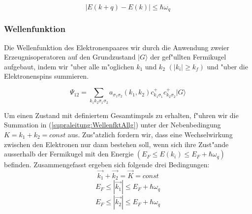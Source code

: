 \begin{refsection}
\begin{equation}
|E(k+q)-E(k)|\le\hbar\omega_q
\label{supraleitung:Phonon Energie}
\end{equation}

\subsubsection{Wellenfunktion}
Die Wellenfunktion des Elektronenpaares wir durch die Anwendung zweier Erzeugnisoperatoren auf den Grundzustand $|G\rangle$ der gef"ullten Fermikugel aufgebaut, indem wir "uber alle m"oglichen $k_1$ und $k_2$ $(|k_i| \ge k_f)$ und "uber die Elektronenspins summieren.

\begin{equation}
\Psi_{12}=\sum \limits_{k_1k_2\sigma_1\sigma_2} a_{\sigma_1\sigma_2}(k_1,k_2)c^+_{k_1\sigma_1}c^+_{k_2\sigma_2}|G\rangle
\label{supraleitung:WellenfktAllg}
\end{equation}

Um einen Zustand mit definiertem Gesamtimpuls zu erhalten, f"uhren wir die Summation in (\ref{supraleitung:WellenfktAllg}) unter der Nebenbedingung $K=k_1+k_2=const$ aus. Zus"atzlich fordern wir, dass eine Wechselwirkung zwischen den Elektronen nur dann bestehen soll, wenn sich ihre Zust"ande ausserhalb der Fermikugel mit den Energie $(E_F \le E(k_i) \le E_F+\hbar\omega_q)$ befinden.
Zusammengefasst ergeben sich folgende drei Bedingungen:
\[
\overrightarrow{k_1}+\overrightarrow{k_2}=\overrightarrow{K}=const
\]
\[
E_F\le|\overrightarrow{k_1}|\le E_F+\hbar\omega_q
\]
\[
E_F\le|\overrightarrow{k_2}|\le E_F+\hbar\omega_q
\]

\end{refsection}
